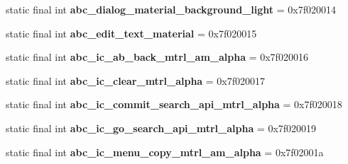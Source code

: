\begin{DoxyCompactItemize}
\item 
\hypertarget{classandroid_1_1support_1_1design_1_1_r_1_1drawable_afcba6d0d4126a0ff138b0e62d7fb14da}{}static final int {\bfseries abc\+\_\+dialog\+\_\+material\+\_\+background\+\_\+light} = 0x7f020014\label{classandroid_1_1support_1_1design_1_1_r_1_1drawable_afcba6d0d4126a0ff138b0e62d7fb14da}

\item 
\hypertarget{classandroid_1_1support_1_1design_1_1_r_1_1drawable_a90fa1994eabee1df8caf70fa65975771}{}static final int {\bfseries abc\+\_\+edit\+\_\+text\+\_\+material} = 0x7f020015\label{classandroid_1_1support_1_1design_1_1_r_1_1drawable_a90fa1994eabee1df8caf70fa65975771}

\item 
\hypertarget{classandroid_1_1support_1_1design_1_1_r_1_1drawable_adcdcd498023a7079ae6403af40287941}{}static final int {\bfseries abc\+\_\+ic\+\_\+ab\+\_\+back\+\_\+mtrl\+\_\+am\+\_\+alpha} = 0x7f020016\label{classandroid_1_1support_1_1design_1_1_r_1_1drawable_adcdcd498023a7079ae6403af40287941}

\item 
\hypertarget{classandroid_1_1support_1_1design_1_1_r_1_1drawable_a1d501e266b6ca51443ecd4e9ad2152cb}{}static final int {\bfseries abc\+\_\+ic\+\_\+clear\+\_\+mtrl\+\_\+alpha} = 0x7f020017\label{classandroid_1_1support_1_1design_1_1_r_1_1drawable_a1d501e266b6ca51443ecd4e9ad2152cb}

\item 
\hypertarget{classandroid_1_1support_1_1design_1_1_r_1_1drawable_a6f2650927b8bc2de3aed0d6182fbdc1c}{}static final int {\bfseries abc\+\_\+ic\+\_\+commit\+\_\+search\+\_\+api\+\_\+mtrl\+\_\+alpha} = 0x7f020018\label{classandroid_1_1support_1_1design_1_1_r_1_1drawable_a6f2650927b8bc2de3aed0d6182fbdc1c}

\item 
\hypertarget{classandroid_1_1support_1_1design_1_1_r_1_1drawable_a74c553fdaa94024363f96f2bb7a08834}{}static final int {\bfseries abc\+\_\+ic\+\_\+go\+\_\+search\+\_\+api\+\_\+mtrl\+\_\+alpha} = 0x7f020019\label{classandroid_1_1support_1_1design_1_1_r_1_1drawable_a74c553fdaa94024363f96f2bb7a08834}

\item 
\hypertarget{classandroid_1_1support_1_1design_1_1_r_1_1drawable_a2f5309e63474158ee7b801b97c57e75c}{}static final int {\bfseries abc\+\_\+ic\+\_\+menu\+\_\+copy\+\_\+mtrl\+\_\+am\+\_\+alpha} = 0x7f02001a\label{classandroid_1_1support_1_1design_1_1_r_1_1drawable_a2f5309e63474158ee7b801b97c57e75c}


\end{DoxyCompactItemize}
